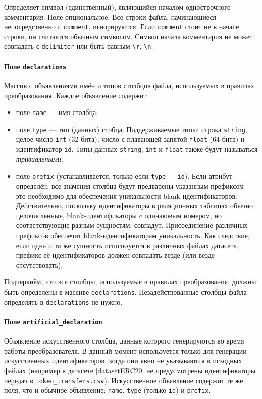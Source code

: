 Определяет символ (единственный), являющийся началом однострочного комментария. Поле опциональное.
Все строки файла, начинающиеся непосредственно с \texttt{comment}, игнорируются. Если \texttt{comment}
стоит не в начале строки, он считается обычным символом. Символ начала комментария не может совпадать с
\texttt{delimiter} или быть равным \texttt{\textbackslash r}, \texttt{\textbackslash n}.

\paragraph{Поле \texttt{declarations}}

Массив с объявлениями имён и типов столбцов файла, используемых в правилах преобразования.
Каждое объявление содержит
\begin{itemize}
    \item поле \texttt{name} --- имя столбца;
    \item поле \texttt{type} --- тип (данных) стобца. Поддерживаемые типы: строка \texttt{string},
целое число \texttt{int} (32 бита), число с плавающей запятой \texttt{float} (64 бита) и
идентификатор \texttt{id}. Типы данных \texttt{string}, \texttt{int} и \texttt{float} также будут
называться \textit{тривиальными};
    \item поле \texttt{prefix} (устанавливается, только если \texttt{type} --- \texttt{id}). Если
атрибут определён, все значения столбца будут предварены указанным префиксом --- это необходимо для
обеспечения уникальности blank-идентификаторов. Действительно, поскольку идентификаторы в реляционных
таблицах обычно целочисленные, blank-идентификаторы c одинаковым номером, но соответствующие разным
сущностям, совпадут. Присоединение различных префиксов обеспечит blank-идентификаторам уникальность.
Как следствие, если одна и та же сущность используется в различных файлах датасета, префикс её
идентификаторов должен совпадать везде (или везде отсутствовать).
\end{itemize}
Подчеркнём, что все столбцы, используемые в правилах преобразования, должны быть определены в
массиве \texttt{declarations}. Незадействованные столбцы файла определять в \texttt{declarations}
не нужно.

\paragraph{Поле \texttt{artificial\_declaration}}

Объявление искусственного столбца, данные которого генерируются во время работы преобразователя. В данный
момент используется только для генерации искусственных идентификаторов, когда они явно не указываются в
исходных файлах (например в датасете \ref{datasetERC20} не предусмотрены идентификаторы передач в
\texttt{token\_transfers.csv}). Искусственное объявление содержит те же поля, что и обычное объявление:
\texttt{name}, \texttt{type} (только \texttt{id}) и \texttt{prefix}.

